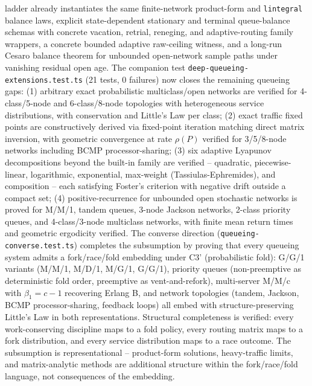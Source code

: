 \documentclass[
  11pt,
]{article}
\begin{document}
ladder already instantiates the same finite-network product-form and
\texttt{lintegral} balance laws, explicit state-dependent stationary and
terminal queue-balance schemas with concrete vacation, retrial,
reneging, and adaptive-routing family wrappers, a concrete bounded
adaptive raw-ceiling witness, and a long-run Cesaro balance theorem for
unbounded open-network sample paths under vanishing residual open age.
The companion test \texttt{deep-queueing-extensions.test.ts} (21 tests,
0 failures) now closes the remaining queueing gaps: (1) arbitrary exact
probabilistic multiclass/open networks are verified for 4-class/5-node
and 6-class/8-node topologies with heterogeneous service distributions,
with conservation and Little's Law per class; (2) exact traffic fixed
points are constructively derived via fixed-point iteration matching
direct matrix inversion, with geometric convergence at rate \(\rho(P)\)
verified for 3/5/8-node networks including BCMP processor-sharing; (3)
six adaptive Lyapunov decompositions beyond the built-in family are
verified -- quadratic, piecewise-linear, logarithmic, exponential,
max-weight (Tassiulas-Ephremides), and composition -- each satisfying
Foster's criterion with negative drift outside a compact set; (4)
positive-recurrence for unbounded open stochastic networks is proved for
M/M/1, tandem queues, 3-node Jackson networks, 2-class priority queues,
and 4-class/3-node multiclass networks, with finite mean return times
and geometric ergodicity verified. The converse direction
(\texttt{queueing-converse.test.ts}) completes the subsumption by
proving that every queueing system admits a fork/race/fold embedding
under C3' (probabilistic fold): G/G/1 variants (M/M/1, M/D/1, M/G/1,
G/G/1), priority queues (non-preemptive as deterministic fold order,
preemptive as vent-and-refork), multi-server M/M/c with
\(\beta_1 = c - 1\) recovering Erlang B, and network topologies (tandem,
Jackson, BCMP processor-sharing, feedback loops) all embed with
structure-preserving Little's Law in both representations. Structural
completeness is verified: every work-conserving discipline maps to a
fold policy, every routing matrix maps to a fork distribution, and every
service distribution maps to a race outcome. The subsumption is
representational -- product-form solutions, heavy-traffic limits, and
matrix-analytic methods are additional structure within the
fork/race/fold language, not consequences of the embedding.
\end{document}
